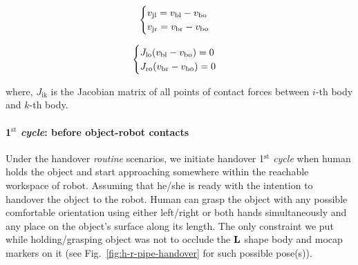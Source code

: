 \begin{equation}\label{joint_vel}
\centering
\begin{cases}
v_\text{jl} = v_\text{bl} - v_\text{bo} \\
v_\text{jr} = v_\text{br} - v_\text{bo} \\
\end{cases}
\end{equation}

\begin{equation}\label{vel_const}
\centering
\begin{cases}
J_\text{lo}(v_\text{bl} - v_\text{bo}) = 0\\
J_\text{ro}(v_\text{br} - v_\text{bo}) = 0\\
\end{cases}
\end{equation}

where, $J_\text{ik}$ is the Jacobian matrix of all points of contact forces between $i$-th body and $k$-th body.


\paragraph*{1$^\text{st}$ \textit{cycle}: before object-robot contacts}

Under the handover \textit{routine} scenarios, we initiate handover 1$^\text{st}$ \textit{cycle} when human holds the object and start approaching somewhere within the reachable workspace of robot. Assuming that he/she is ready with the intention to handover the object to the robot. Human can grasp the object with any possible comfortable orientation using either left/right or both hands simultaneously and any place on the object's surface along its length. The only constraint we put while holding/grasping object was not to occlude the ${\bf L}$ shape body and mocap markers on it (see Fig.~\ref{fig:h-r-pipe-handover} for such possible pose(s)).


